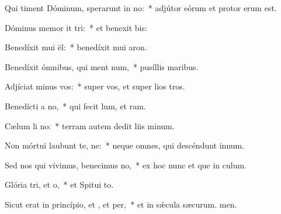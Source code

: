 \item Qui timent Dóminum, sperarunt in no:~* adjútor eórum et protor erum est.
\item Dóminus memor it tri:~* et benexit bis:
\item Benedíxit mui ël:~* benedíxit mui aron.
\item Benedíxit ómnibus, qui ment num,~* pusíllis  maribus.
\item Adjíciat minus  vos:~* super vos, et super lios tros.
\item Benedícti  a no,~* qui fecit lum, et ram.
\item Cælum li no:~* terram autem dedit liis minum.
\item Non mórtui laubunt te, ne:~* neque omnes, qui descéndunt  innum.
\item Sed nos qui vívimus, benecimus no,~* ex hoc nunc et que in culum.
\item Glória tri, et o,~* et Spitui to.
\item Sicut erat in princípio, et , et per,~* et in sǽcula sæcurum. men.
